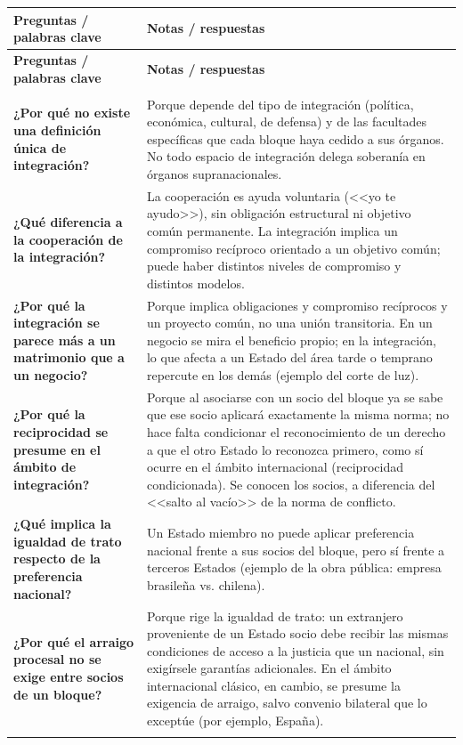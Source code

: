 \documentclass[12pt,oneside]{book}
\newlength{\cornizq}
\newlength{\cornder}
\newlength{\cornancho}
\newenvironment{cornell}
{%
    \small
    \renewcommand{\arraystretch}{1.3}%
    \begin{longtable}{>{\raggedright\arraybackslash}p{\cornizq}!{\vrule width 0.4pt}>{\raggedright\arraybackslash}p{\cornder}}
    \toprule
    \textbf{Preguntas / palabras clave} & \textbf{Notas / respuestas} \\
    \midrule
    \endfirsthead
    \toprule
    \textbf{Preguntas / palabras clave} & \textbf{Notas / respuestas} \\
    \midrule
    \endhead
    \midrule
    \multicolumn{2}{r}{\footnotesize\itshape continúa en la página siguiente} \\
    \endfoot
    \bottomrule
    \endlastfoot
}
{%
    \end{longtable}%
}
\begin{document}
\begin{cornell}
\textbf{¿Por qué no existe una definición única de integración?} &
Porque depende del tipo de integración (política, económica, cultural, de defensa) y de las facultades específicas que cada bloque haya cedido a sus órganos. No todo espacio de integración delega soberanía en órganos supranacionales. \\
\textbf{¿Qué diferencia a la cooperación de la integración?} &
La cooperación es ayuda voluntaria (<<yo te ayudo>>), sin obligación estructural ni objetivo común permanente. La integración implica un compromiso recíproco orientado a un objetivo común; puede haber distintos niveles de compromiso y distintos modelos. \\
\textbf{¿Por qué la integración se parece más a un matrimonio que a un negocio?} &
Porque implica obligaciones y compromiso recíprocos y un proyecto común, no una unión transitoria. En un negocio se mira el beneficio propio; en la integración, lo que afecta a un Estado del área tarde o temprano repercute en los demás (ejemplo del corte de luz). \\
\textbf{¿Por qué la reciprocidad se presume en el ámbito de integración?} &
Porque al asociarse con un socio del bloque ya se sabe que ese socio aplicará exactamente la misma norma; no hace falta condicionar el reconocimiento de un derecho a que el otro Estado lo reconozca primero, como sí ocurre en el ámbito internacional (reciprocidad condicionada). Se conocen los socios, a diferencia del <<salto al vacío>> de la norma de conflicto. \\
\textbf{¿Qué implica la igualdad de trato respecto de la preferencia nacional?} &
Un Estado miembro no puede aplicar preferencia nacional frente a sus socios del bloque, pero sí frente a terceros Estados (ejemplo de la obra pública: empresa brasileña vs. chilena). \\
\textbf{¿Por qué el arraigo procesal no se exige entre socios de un bloque?} &
Porque rige la igualdad de trato: un extranjero proveniente de un Estado socio debe recibir las mismas condiciones de acceso a la justicia que un nacional, sin exigírsele garantías adicionales. En el ámbito internacional clásico, en cambio, se presume la exigencia de arraigo, salvo convenio bilateral que lo exceptúe (por ejemplo, España). \\
\midrule
{} \\
\end{cornell}
\end{document}
